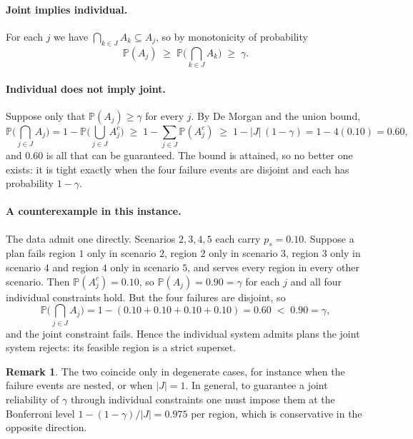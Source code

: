 \documentclass[11pt]{article}
\theoremstyle{definition}\newtheorem*{definition}{Definition}
\theoremstyle{definition}
\newtheorem{remark}{Remark}
\begin{document}
\paragraph{Joint implies individual.} For each $j$ we have
$\bigcap_{k \in J} A_k \subseteq A_j$, so by monotonicity of probability
\[
  \mathbb{P}(A_j) \;\ge\;
  \mathbb{P}\Big(\bigcap_{k \in J} A_k\Big) \;\ge\; \gamma .
\]

\paragraph{Individual does not imply joint.} Suppose only that
$\mathbb{P}(A_j) \ge \gamma$ for every $j$. By De Morgan and the union
bound,
\begin{equation}
  \mathbb{P}\Big(\bigcap_{j \in J} A_j\Big)
  = 1 - \mathbb{P}\Big(\bigcup_{j \in J} A_j^{c}\Big)
  \;\ge\; 1 - \sum_{j \in J} \mathbb{P}(A_j^{c})
  \;\ge\; 1 - |J|\,(1-\gamma)
  = 1 - 4(0.10) = 0.60 ,
  \label{eq:bonferroni}
\end{equation}
and $0.60$ is all that can be guaranteed. The bound is attained, so no
better one exists: it is tight exactly when the four failure events are
disjoint and each has probability $1-\gamma$.

\paragraph{A counterexample in this instance.} The data admit one
directly. Scenarios $2,3,4,5$ each carry $p_s = 0.10$. Suppose a plan
fails region $1$ only in scenario $2$, region $2$ only in scenario $3$,
region $3$ only in scenario $4$ and region $4$ only in scenario $5$, and
serves every region in every other scenario. Then
$\mathbb{P}(A_j^{c}) = 0.10$, so $\mathbb{P}(A_j) = 0.90 = \gamma$ for
each $j$ and all four individual constraints hold. But the four failures
are disjoint, so
\[
  \mathbb{P}\Big(\bigcap_{j\in J} A_j\Big)
  = 1 - (0.10 + 0.10 + 0.10 + 0.10) = 0.60 \;<\; 0.90 = \gamma,
\]
and the joint constraint fails. Hence the individual system admits plans
the joint system rejects: its feasible region is a strict superset.

\begin{remark}
The two coincide only in degenerate cases, for instance when the failure
events are nested, or when $|J| = 1$. In general, to guarantee a joint
reliability of $\gamma$ through individual constraints one must impose
them at the Bonferroni level $1 - (1-\gamma)/|J| = 0.975$ per region,
which is conservative in the opposite direction.
\end{remark}
\end{document}
